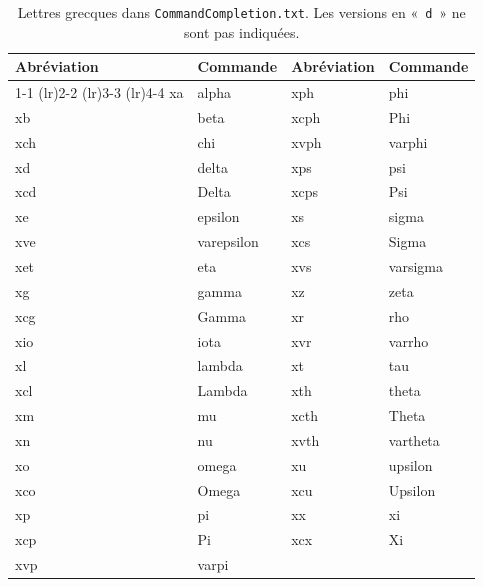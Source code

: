 \documentclass[11pt]{article}
\newcommand{\CCT}{\texttt{CommandCompletion.txt}}
\begin{document}
\begin{table}[!h]
\small
\centering
\caption{Lettres grecques dans \CCT. Les versions en «~\texttt{d}~» ne sont pas indiquées.}
\label{tbl:greek}
\vspace{10pt}
\begin{tabular}{llll}
\textbf{Abréviation} & \textbf{Commande} & \textbf{Abréviation} & \textbf{Commande} \\
\cmidrule[0.5pt](lr){1-1} \cmidrule[0.5pt](lr){2-2} \cmidrule[0.5pt](lr){3-3} \cmidrule[0.5pt](lr){4-4}
xa  & alpha      & xph  & phi \\
xb  & beta       & xcph & Phi \\
xch & chi        & xvph & varphi \\
xd  & delta      & xps  & psi \\
xcd & Delta      & xcps & Psi \\
xe  & epsilon    & xs   & sigma \\
xve & varepsilon & xcs  & Sigma \\
xet & eta        & xvs  & varsigma \\
xg  & gamma      & xz   & zeta \\
xcg & Gamma      & xr   & rho \\
xio & iota       & xvr  & varrho \\
xl  & lambda     & xt   & tau \\
xcl & Lambda     & xth  & theta \\
xm  & mu         & xcth & Theta \\
xn  & nu         & xvth & vartheta \\
xo  & omega      & xu   & upsilon \\
xco & Omega      & xcu  & Upsilon \\
xp  & pi         & xx   & xi \\
xcp & Pi         & xcx  & Xi \\
xvp & varpi      &      & \\
\end{tabular}
\end{table}
\end{document}
